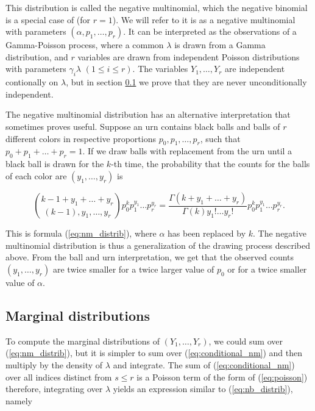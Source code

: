 \documentclass[12pt]{article}
\begin{document}
\begin{appendices}
    This distribution is called the negative multinomial, which
    the negative binomial is a special case of (for $r=1$). We will
    refer to it is as a negative multinomial with parameters
    $(\alpha, p_1, \ldots, p_r)$. It can be interpreted as the
    observations of a Gamma-Poisson process, where a common $\lambda$
    is drawn from a Gamma distribution, and $r$ variables are drawn
    from independent Poisson distributions with parameters
    $\gamma_i \lambda$ $(1 \leq i \leq r)$. The variables
    $Y_1, \ldots, Y_r$ are independent contionally on $\lambda$,
    but in section \ref{sec:marginal_nm} we prove
    that they are never unconditionally independent.

    The negative multinomial distribution has an alternative
    interpretation that sometimes proves useful. Suppose an urn
    contains black balls and balls of $r$ different
    colors in respective proportions $p_0, p_1, \ldots, p_r$, such
    that $p_0 + p_1 + \ldots + p_r =1$. If we draw balls with
    replacement from the urn until a black ball is drawn for the
    $k$-th time, the probability that the counts for the balls of
    each color are $(y_1, \ldots, y_r)$ is

    \begin{equation*}
    {k-1+y_1+\ldots+y_r \choose (k-1), y_1, \ldots, y_r}
      p_0^k p_1^{y_1} \ldots p_r^{y_r} =
    \frac{\Gamma(k+y_1+\ldots+y_r)}{\Gamma(k)y_1! \ldots y_r!}
      p_0^k p_1^{y_1} \ldots p_r^{y_r}.
    \end{equation*}

    This is formula (\ref{eq:nm_distrib}), where $\alpha$ has
    been replaced by $k$. The negative multinomial distribution is
    thus a generalization of the drawing process described above.
    From the ball and urn interpretation, we get that the observed
    counts $(y_1, \ldots, y_r)$ are twice smaller for a twice larger
    value of $p_0$ or for a twice smaller value of $\alpha$.

\subsection{Marginal distributions}
\label{sec:marginal_nm}

    To compute the marginal distributions of
    $(Y_1, \ldots, Y_r)$, we could sum over (\ref{eq:nm_distrib}),
    but it is simpler to sum over (\ref{eq:conditional_nm}) and then
    multiply by the density of $\lambda$ and integrate. The sum of
    (\ref{eq:conditional_nm}) over all indices distinct from
    $s \leq r$ is a Poisson term of the form of (\ref{eq:poisson})
    therefore, integrating over $\lambda$ yields an expression
    similar to (\ref{eq:nb_distrib}), namely


\end{appendices}
\end{document}
